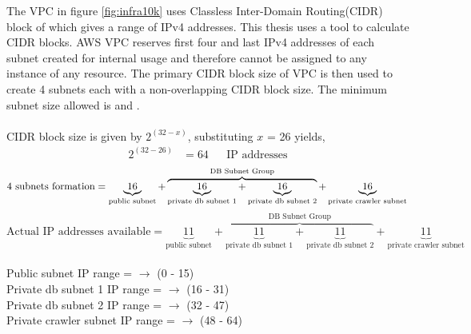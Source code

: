 \noindent
The VPC in figure \ref{fig:infra10k} uses Classless Inter-Domain Routing(CIDR) block of  which
gives a range of  IPv4 addresses. This thesis uses a tool \cite{cidr} to calculate CIDR
blocks. AWS VPC reserves first four and last IPv4 addresses of each subnet created for internal usage and
therefore cannot be assigned to any instance of any resource. The primary CIDR block size of VPC is then
used to create 4 subnets each with a non-overlapping CIDR block size. The minimum
subnet size allowed is  and .
\\
\\
CIDR block size is given by $2^{(32 - x)}$, substituting $x$ = 26 yields,
\begin{align*}
  2^{(32 - 26)} &= 64 && \text{IP addresses}
\end{align*}
\[
\text{4 subnets formation} = \underbrace{16}_\text{public subnet} + \overbrace{\underbrace{16}_\text{private db subnet 1} + \underbrace{16}_\text{private db subnet 2}}^\text{DB Subnet Group} + \underbrace{16}_\text{private crawler subnet} 
\\
\]
\[
\text{Actual IP addresses available} = \underbrace{11}_\text{public subnet} + \overbrace{\underbrace{11}_\text{private db subnet 1} + \underbrace{11}_\text{private db subnet 2}}^\text{DB Subnet Group} + \underbrace{11}_\text{private crawler subnet}
\]
\\
Public subnet IP range =  $\rightarrow$ (0 - 15)
\\                                                
Private db subnet 1 IP range =  $\rightarrow$ (16 - 31)
\\                                                
Private db subnet 2 IP range =  $\rightarrow$ (32 - 47)
\\
Private crawler subnet IP range =  $\rightarrow$ (48 - 64)